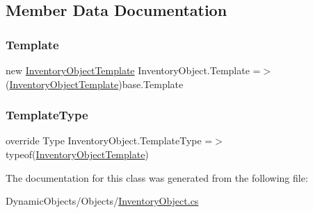 \subsection{Member Data Documentation}
\mbox{\label{class_inventory_object_a977119b3dcb32a34cbd0ee72fba31f6b}} 
\subsubsection{\texorpdfstring{Template}{Template}}
{\footnotesize\ttfamily new \mbox{\hyperlink{class_inventory_object_template}{Inventory\+Object\+Template}} Inventory\+Object.\+Template =$>$ (\mbox{\hyperlink{class_inventory_object_template}{Inventory\+Object\+Template}})base.\+Template}

\mbox{\label{class_inventory_object_a5b0f2109da22d83062365786fabf25c5}} 
\subsubsection{\texorpdfstring{Template\+Type}{TemplateType}}
{\footnotesize\ttfamily override Type Inventory\+Object.\+Template\+Type =$>$ typeof(\mbox{\hyperlink{class_inventory_object_template}{Inventory\+Object\+Template}})\hspace{0.3cm}{\ttfamily [protected]}}



The documentation for this class was generated from the following file\+:\begin{DoxyCompactItemize}
\item 
Dynamic\+Objects/\+Objects/\mbox{\hyperlink{_inventory_object_8cs}{Inventory\+Object.\+cs}}\end{DoxyCompactItemize}
